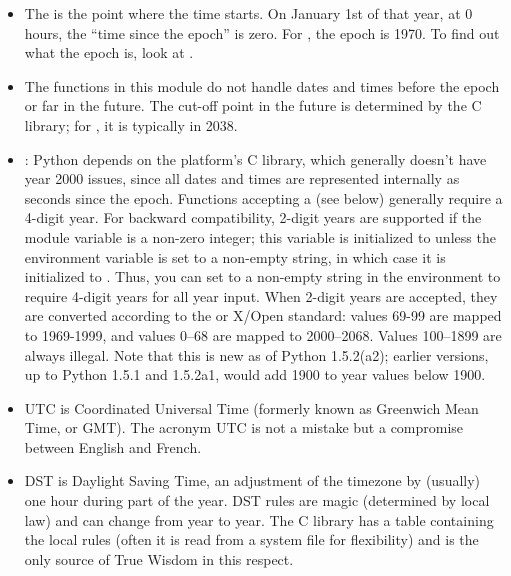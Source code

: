 \begin{itemize}

\item
The  is the point where the time starts.  On
January 1st of that year, at 0 hours, the ``time since the epoch'' is
zero.  For \UNIX, the epoch is 1970.  To find out what the epoch is,
look at .

\item
The functions in this module do not handle dates and times before the
epoch or far in the future.  The cut-off point in the future is
determined by the C library; for \UNIX, it is typically in
2038.

\item
{}:  Python
depends on the platform's C library, which generally doesn't have year
2000 issues, since all dates and times are represented internally as
seconds since the epoch.  Functions accepting a 
(see below) generally require a 4-digit year.  For backward
compatibility, 2-digit years are supported if the module variable
 is a non-zero integer; this variable is
initialized to  unless the environment variable
 is set to a non-empty string, in which case it is
initialized to .  Thus, you can set
 to a non-empty string in the environment to require 4-digit
years for all year input.  When 2-digit years are accepted, they are
converted according to the \POSIX{} or X/Open standard: values 69-99
are mapped to 1969-1999, and values 0--68 are mapped to 2000--2068.
Values 100--1899 are always illegal.  Note that this is new as of
Python 1.5.2(a2); earlier versions, up to Python 1.5.1 and 1.5.2a1,
would add 1900 to year values below 1900.

\item
UTC is Coordinated Universal Time (formerly known as Greenwich Mean
Time, or GMT).  The acronym UTC is not a
mistake but a compromise between English and French.

\item
DST is Daylight Saving Time, an adjustment
of the timezone by (usually) one hour during part of the year.  DST
rules are magic (determined by local law) and can change from year to
year.  The C library has a table containing the local rules (often it
is read from a system file for flexibility) and is the only source of
True Wisdom in this respect.


\end{itemize}
